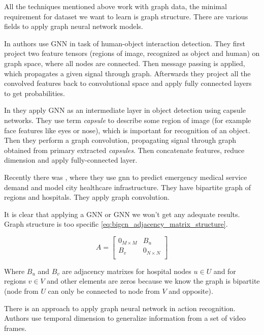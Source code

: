 All the techniques mentioned above work with graph data, the minimal requirement for dataset we want to learn is graph structure. There are various fields to apply graph neural network models.

In \cite{Yang_Zou_2020} authors use GNN in task of human-object interaction detection. They first project two feature tensors (regions of image, recognized as object and human) on graph space, where all nodes are connected. Then message passing is applied, which propagates a given signal through graph. Afterwards they project all the convolved features back to convolutional space and apply fully connected layers to get probabilities.

In \cite{Gu_Tresp_2020} they apply GNN as an intermediate layer in object detection using capsule networks. They use term \textit{capsule} to describe some region of image (for example face features like eyes or nose), which is important for recognition of an object. Then they perform a graph convolution, propagating signal through graph obtained from primary extracted \textit{capsules}. Then concatenate features, reduce dimension and apply fully-connected layer.

Recently there was \cite{Jin_Xia_Liu_Murata_Kim_2021}, where they use gnn to predict emergency medical service demand and model city healthcare infrastructure. They have bipartite graph of regions and hospitals. They apply graph convolution.

It is clear that applying a GNN or GNN we won't get any adequate results. Graph structure is too specific \ref{eq:bigcn_adjacency_matrix_structure}.

\begin{equation}
    A=\begin{bmatrix}
        0_{M\times M} & B_u           \\
        B_v           & 0_{N\times N} \\
    \end{bmatrix}
    \label{eq:bigcn_adjacency_matrix_structure}
\end{equation}

Where $B_u$ and $B_v$ are adjacency matrixes for hospital nodes $u\in U$ and for regions $v\in V$ and other elements are zeros because we know the graph is bipartite (node from $U$ can only be connected to node from $V$ and opposite).

There is an approach \cite{Cheng_Zhang_He_Chen_Cheng_Lu_2020} to apply graph neural network in action recognition. Authors use temporal dimension to generalize information from a set of video frames.

